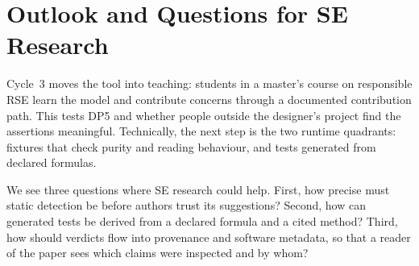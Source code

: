\documentclass[conference,10pt]{IEEEtran}
\begin{document}
\section{Outlook and Questions for SE Research}
Cycle~3 moves the tool into teaching: students in a master's course on responsible RSE learn the model and contribute concerns through a documented contribution path. This tests DP5 and whether people outside the designer's project find the assertions meaningful. Technically, the next step is the two runtime quadrants: fixtures that check purity and reading behaviour, and tests generated from declared formulas.

We see three questions where SE research could help. First, how precise must static detection be before authors trust its suggestions? Second, how can generated tests be derived from a declared formula and a cited method? Third, how should verdicts flow into provenance and software metadata, so that a reader of the paper sees which claims were inspected and by whom?



\end{document}
